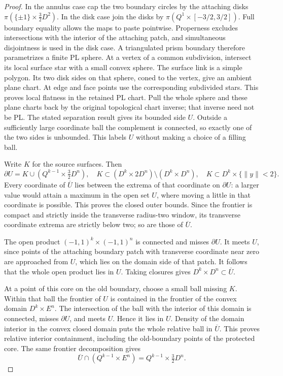 \begin{proof}
In the annulus case cap the two boundary circles by the attaching
disks $\pi(\{\pm1\}\times\tfrac32D^2)$.  In the disk case join
the disks by $\pi(Q^1\times[-3/2,3/2])$.  Full boundary equality
allows the maps to paste pointwise.  Properness excludes intersections
with the interior of the attaching patch, and simultaneous
disjointness is used in the disk case.  A triangulated prism boundary
therefore parametrizes a finite PL sphere.  At a vertex of a common
subdivision, intersect its local surface star with a small convex
sphere.  The surface link is a simple polygon.  Its two disk sides
on that sphere, coned to the vertex, give an ambient plane chart.
At edge and face points use the corresponding subdivided stars.
This proves local flatness in the retained PL chart.  Pull the
whole sphere and these plane charts back by the original topological
chart inverse; that inverse need not be PL.  The stated separation
result gives its bounded side $U$.  Outside a sufficiently large
coordinate ball the complement is connected, so exactly one of
the two sides is unbounded.  This labels $U$ without making a
choice of a filling ball.

Write $K$ for the source surfaces.  Then
\[
 \partial U=K\cup(Q^{k-1}\times\tfrac32D^n),\quad
 K\subset(D^k\times2D^n)\setminus(D^k\times D^n),\quad
 K\subset D^k\times\{\|y\|<2\}.
\]
Every coordinate of $\overline U$ lies between the extrema of that
coordinate on $\partial U$: a larger value would attain a maximum
in the open set $U$, where moving a little in that coordinate is
possible.  This proves the closed outer bounds.  Since the frontier
is compact and strictly inside the transverse radius-two window,
its transverse coordinate extrema are strictly below two; so are
those of $\overline U$.

The open product $(-1,1)^k\times(-1,1)^n$ is connected and misses
$\partial U$.  It meets $U$, since points of the attaching boundary
patch with transverse coordinate near zero are approached from $U$,
which lies on the domain side of that patch.  It follows that the
whole open product lies in $U$.  Taking closures gives
$D^k\times D^n\subset\overline U$.

At a point of this core on the old boundary, choose a small ball
missing $K$.  Within that ball the frontier of $U$ is contained in
the frontier of the convex domain $D^k\times E^n$.  The intersection
of the ball with the interior of this domain is connected, misses
$\partial U$, and meets $U$.  Hence it lies in $U$.  Density of the
domain interior in the convex closed domain puts the whole relative
ball in $\overline U$.  This proves relative interior containment,
including the old-boundary points of the protected core.  The same
frontier decomposition gives
\[
 \overline U\cap(Q^{k-1}\times E^n)
                 =Q^{k-1}\times\tfrac32D^n.
\]


\end{proof}
